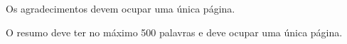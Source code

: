 \documentclass[Portugues]{ic-tese-v3}
\begin{document}





\mestrado







\paginasiniciais




%


Os agradecimentos devem ocupar uma única página.


\begin{resumo}
O resumo deve ter no máximo 500 palavras e deve ocupar uma única página.
\end{resumo}
\end{document}
